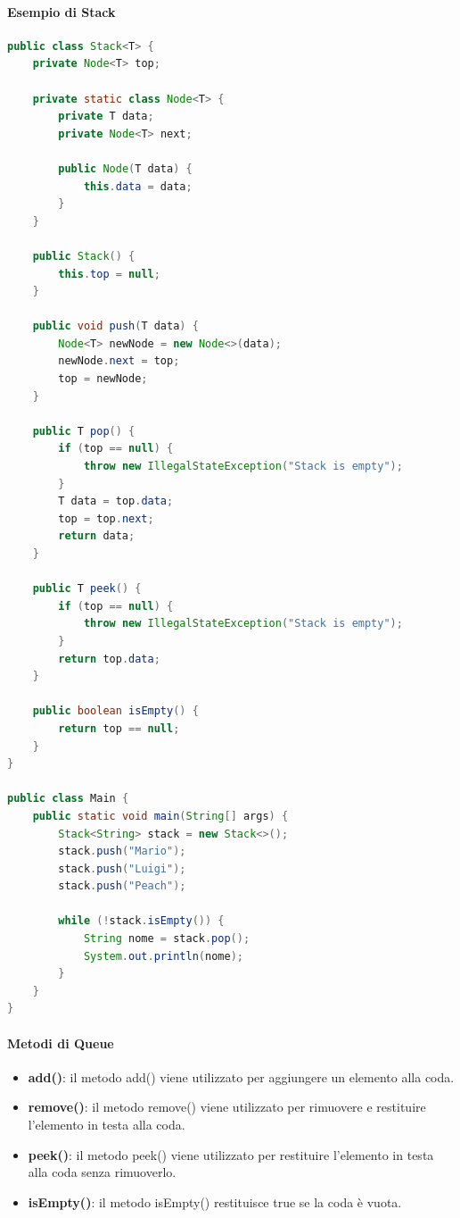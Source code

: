 \documentclass[11pt]{article}
\begin{document}
\paragraph{Esempio di Stack}
\begin{lstlisting}[language=Java]
public class Stack<T> {
    private Node<T> top;

    private static class Node<T> {
        private T data;
        private Node<T> next;

        public Node(T data) {
            this.data = data;
        }
    }

    public Stack() {
        this.top = null;
    }

    public void push(T data) {
        Node<T> newNode = new Node<>(data);
        newNode.next = top;
        top = newNode;
    }

    public T pop() {
        if (top == null) {
            throw new IllegalStateException("Stack is empty");
        }
        T data = top.data;
        top = top.next;
        return data;
    }

    public T peek() {
        if (top == null) {
            throw new IllegalStateException("Stack is empty");
        }
        return top.data;
    }

    public boolean isEmpty() {
        return top == null;
    }
}

public class Main {
    public static void main(String[] args) {
        Stack<String> stack = new Stack<>();
        stack.push("Mario");
        stack.push("Luigi");
        stack.push("Peach");

        while (!stack.isEmpty()) {
            String nome = stack.pop();
            System.out.println(nome);
        }
    }
}
\end{lstlisting}
\paragraph{Metodi di Queue}
\begin{itemize}
    \item \textbf{add()}: il metodo add() viene utilizzato per aggiungere un elemento alla coda.
    \item \textbf{remove()}: il metodo remove() viene utilizzato per rimuovere e restituire l'elemento in testa alla coda.
    \item \textbf{peek()}: il metodo peek() viene utilizzato per restituire l'elemento in testa alla coda senza rimuoverlo.
    \item \textbf{isEmpty()}: il metodo isEmpty() restituisce true se la coda è vuota.
    \end{itemize}
\end{document}
